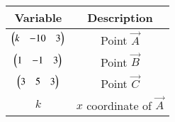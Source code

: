 \begin{tabular}[12pt]{ |c| c|}
    \hline
    \textbf{Variable} & \textbf{Description}\\ 
    \hline
	$\begin{pmatrix}k &-10 & 3\end{pmatrix}$ & Point $\vec{A}$\\
    \hline 
	$\begin{pmatrix}1 & -1 & 3\end{pmatrix}$ & Point $\vec{B}$\\
    \hline
	$\begin{pmatrix}3 & 5 & 3 \end{pmatrix}$ & Point $\vec{C}$\\
    \hline   
	$k$ & $x$ coordinate of $\vec{A}$\\
    \hline
    \end{tabular}
